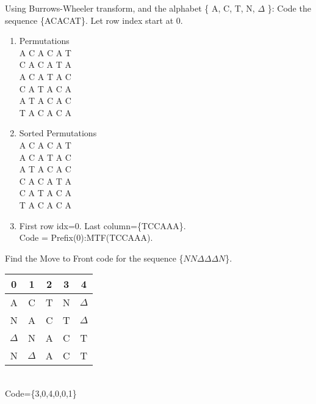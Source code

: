 \begin{solution}
\begin{enumerate}
\end{enumerate}




\end{solution}


\begin{question}
Using Burrows-Wheeler transform, and the alphabet \{ A, C, T, N, $\Delta$ \}:
Code the sequence \{ACACAT\}. Let row index start at 0.
\end{question}
\begin{solution}
\begin{enumerate}
\item Permutations \\
A C A C A T \\
C A C A T A \\
A C A T A C \\
C A T A C A \\
A T A C A C \\
T A C A C A 
\item Sorted Permutations \\ 
A C A C A T \\
A C A T A C \\
A T A C A C \\
C A C A T A \\
C A T A C A \\
T A C A C A \\ 
\item First row idx=0. Last column=\{TCCAAA\}. \\
Code = Prefix(0):MTF(TCCAAA).
\end{enumerate}
\end{solution}


\begin{question}
Find the Move to Front code for the sequence \{$N N \Delta \Delta \Delta N$\}.
\end{question}
\begin{solution}
\begin{tabular}{|c|c|c|c|c|}
\hline 
0 & 1 & 2 & 3 & 4 \\ 
\hline 
A & C & T & N & $\Delta$ \\ 
\hline 
N & A & C & T & $\Delta$ \\ 
\hline 
$\Delta$ & N & A & C & T \\ 
\hline 
N & $\Delta$ & A & C & T \\ 
\hline 
\end{tabular} \\
Code=\{3,0,4,0,0,1\}
\end{solution}


